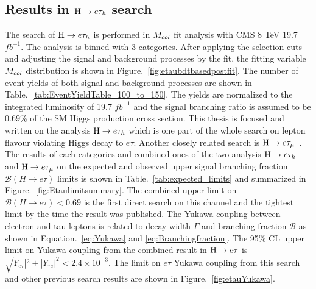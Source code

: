 \subsection{Results in $\mathrm{H} \to e \tau_{h}$ search}
The search of $\mathrm{H} \to e \tau_{h}$ is performed in $M_{col}$ fit analysis with CMS 8 TeV 19.7 $fb^{-1}$. The analysis is binned with 3 categories. After applying the selection cuts and adjusting the signal and background processes by the fit, the fitting variable $M_{col}$ distribution is shown in Figure.~\ref{fig:etaubdtbasedpostfit}. The number of event yields of both signal and background processes are shown in Table.~\ref{tab:EventYieldTable_100_to_150}. The yields are normalized to the integrated luminosity of 19.7 $fb^{-1}$ and the signal branching ratio is assumed to be 0.69\% of the SM Higgs production cross section. This thesis is focused and written on the analysis $\mathrm{H} \to e \tau_{h}$ which is one part of the whole search on lepton flavour violating Higgs decay to $e\tau$. Another closely related search is $\mathrm{H} \to e \tau_{\mu}$~\cite{HIG-14-040}. The results of each categories and combined ones of the two analysis $\mathrm{H} \to e \tau_{h}$ and $\mathrm{H} \to e \tau_{\mu}$ on the expected and observed upper signal branching fraction $\mathcal{B}(H \to e \tau)$ limits is shown in Table.~\ref{tab:expected_limits} and summarized in Figure.~\ref{fig:Etaulimitsummary}.  The combined upper limit on $\mathcal{B}(H \to e \tau)<0.69$ is the first direct search on this channel and the tightest limit by the time the result was published. The Yukawa coupling between electron and tau leptons is related to decay width $\Gamma$ and branching fraction $\mathcal{B}$ as shown in Equation.~\ref{eq:Yukawa} and \ref{eq:Branchingfraction}. The 95\% CL upper limit on Yukawa coupling from the combined result in $\mathrm{H} \to e \tau$ is $\sqrt{Y_{e\tau}|^2 + |Y_{\tau e}|^2}<2.4\times 10^{-3}$. The limit on $e\tau$ Yukawa coupling from this search and other previous search results are shown in Figure.~\ref{fig:etauYukawa}.









